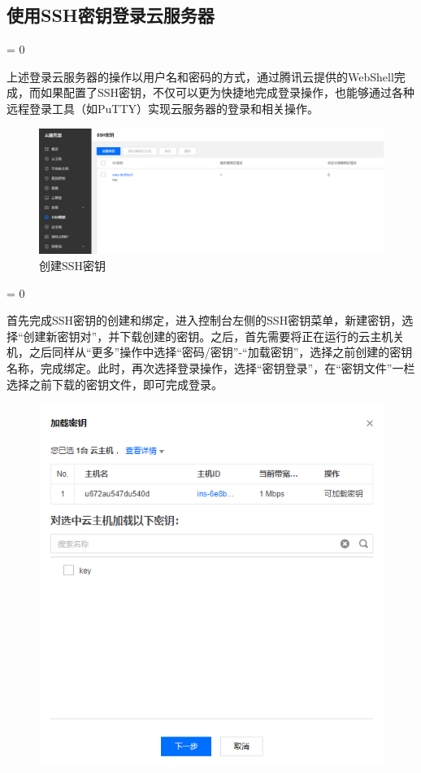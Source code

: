 \documentclass[a4paper,11pt]{ctexart}
\newcommand{\subpar}
{
	\par
	\hangafter = 0
	\setlength{\hangindent}{1em}
}
\begin{document}
\begin{spacing}{1.5}
\subsection{使用SSH密钥登录云服务器}
\subpar
上述登录云服务器的操作以用户名和密码的方式，通过腾讯云提供的WebShell完成，而如果配置了SSH密钥，不仅可以更为快捷地完成登录操作，也能够通过各种远程登录工具（如PuTTY）实现云服务器的登录和相关操作。
\begin{figure}[h]
	\centering
	\setlength{\abovecaptionskip}{2mm}
	\setlength{\belowcaptionskip}{-2mm}
	\includegraphics[scale=0.4]{SSH1.png}
	\caption{创建SSH密钥}\label{figure:SSH1}
\end{figure}
\subpar
首先完成SSH密钥的创建和绑定，进入控制台左侧的SSH密钥菜单，新建密钥，选择“创建新密钥对”，并下载创建的密钥。之后，首先需要将正在运行的云主机关机，之后同样从“更多”操作中选择“密码/密钥”-“加载密钥”，选择之前创建的密钥名称，完成绑定。此时，再次选择登录操作，选择“密钥登录”，在“密钥文件”一栏选择之前下载的密钥文件，即可完成登录。
\begin{figure}[h]
	\centering
	\setlength{\abovecaptionskip}{2mm}
	\setlength{\belowcaptionskip}{-2mm}
	\includegraphics[scale=0.4]{SSH2.png}

\end{figure}
\end{spacing}
\end{document}
